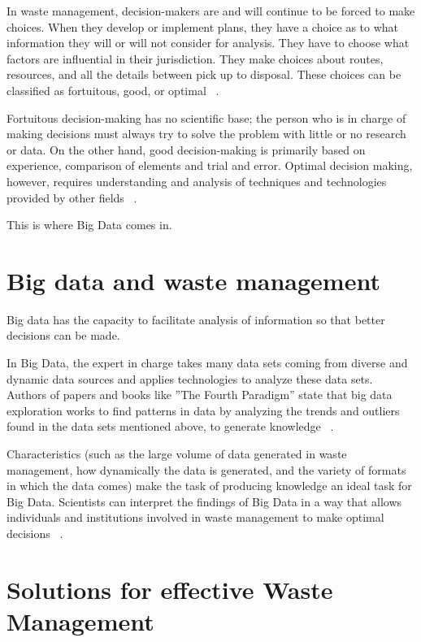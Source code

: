 \documentclass[sigconf]{acmart}
\begin{document}
In waste management, decision-makers are and will continue to be forced to make choices.  When they develop or implement plans, they have a choice as to what information they will or will not consider for analysis.  They have to choose what factors are influential in their jurisdiction.  They make choices about routes, resources, and all the details between pick up to disposal.  These choices can be classified as fortuitous, good, or optimal ~\cite{akbarpour2016}.

Fortuitous decision-making has no scientific base; the person who is in charge of making decisions must always try to solve the problem with little or no research or data.   On the other hand, good decision-making is primarily based on experience, comparison of elements and trial and error.  Optimal decision making, however, requires understanding and analysis of techniques and technologies provided by other fields ~\cite{akbarpour2016}. 

This is where Big Data comes in. 

\section{ Big data and waste management}

Big data has the capacity to facilitate analysis of information so that better decisions can be made.

In Big Data, the expert in charge takes many data sets coming from diverse and dynamic data sources and applies technologies to analyze these data sets.  Authors of papers and books like ''The Fourth Paradigm'' state that big data exploration works to find patterns in data by analyzing the trends and outliers found in the data sets mentioned above, to generate knowledge ~\cite{hey2009fourth}.

Characteristics (such as the large volume of data generated in waste management, how dynamically the data is generated, and the variety of formats in which the data comes) make the task of producing knowledge an ideal task for Big Data.  Scientists can interpret the findings of Big Data  in a way that allows individuals and institutions involved in waste management to make optimal decisions ~\cite{yenkar2014review}. 

\section{Solutions for effective Waste Management}
\end{document}
